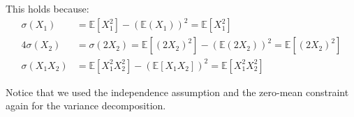 This holds because:
\begin{align*}
    \sigma(X_1) &= \mathbb{E}[X_1^2] - (\mathbb{E}(X_1))^2 = \mathbb{E}[X_1^2] \\
    4\sigma(X_2) &=  \sigma(2X_2) = \mathbb{E}[(2X_2)^2] - (\mathbb{E}(2X_2))^2 = \mathbb{E}[(2X_2)^2] \\
    \sigma(X_1X_2) &= \mathbb{E}[X_1^2X_2^2] - (\mathbb{E}[X_1X_2])^2 = \mathbb{E}[X_1^2X_2^2]
\end{align*}

Notice that we used the independence assumption and the zero-mean constraint again for the variance decomposition.











